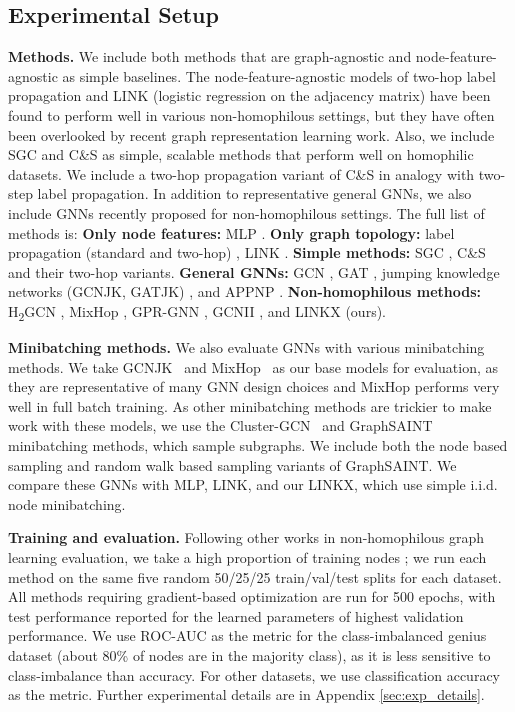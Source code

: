 \documentclass{article}
\newcommand{\myparagraph}[1]{\noindent \textbf{#1}}
\begin{document}
\subsection{Experimental Setup}\label{sec:experimental_setup}

\myparagraph{Methods.} We include both methods that are graph-agnostic and node-feature-agnostic as simple baselines. The node-feature-agnostic models of two-hop label propagation \cite{peel2017graph} and LINK (logistic regression on the adjacency matrix) \cite{zheleva2009to} have been found to perform well in various non-homophilous settings, but they have often been overlooked by recent graph representation learning work. Also, we include SGC \cite{wu2019simplifying} and C\&S \cite{huang2021combining} as simple, scalable methods that perform well on homophilic datasets. We include a two-hop propagation variant of C\&S in analogy with two-step label propagation. In addition to representative general GNNs, we also include GNNs recently proposed for non-homophilous settings. The full list of methods is: \textbf{Only node features:} MLP \cite{goodfellow2016deep}.
\textbf{Only graph topology:} label propagation (standard and two-hop) \cite{zhou2004learning, peel2017graph}, LINK \cite{zheleva2009to}.
\textbf{Simple methods:} SGC \cite{wu2019simplifying}, C\&S \cite{huang2021combining} and their two-hop variants.
\textbf{General GNNs:} GCN \cite{kipf2017semi}, GAT \cite{velivckovic2018graph}, jumping knowledge networks (GCNJK, GATJK) \cite{xu2018representation}, and APPNP \cite{klicpera2019predict}.
\textbf{Non-homophilous methods:} H\textsubscript{2}GCN \cite{zhu2020beyond}, MixHop \cite{abu2019mixhop}, GPR-GNN \cite{chien2021adaptive}, GCNII \cite{chen2020simple}, and LINKX (ours).

\myparagraph{Minibatching methods.} We also evaluate GNNs with various minibatching methods. We take GCNJK~\cite{xu2018representation} and MixHop~\cite{abu2019mixhop} as our base models for evaluation, as they are representative of many GNN design choices and MixHop performs very well in full batch training. As other minibatching methods are trickier to make work with these models, we use the Cluster-GCN~\cite{chiang2019cluster} and GraphSAINT~\cite{zeng2019graphsaint} minibatching methods, which sample subgraphs. We include both the node based sampling and random walk based sampling variants of GraphSAINT. We compare these GNNs with MLP, LINK, and our LINKX, which use simple i.i.d. node minibatching.

\myparagraph{Training and evaluation.} Following other works in non-homophilous graph learning evaluation, we take a high proportion of training nodes \cite{zhu2020beyond, pei2019geom, yan2021two}; we run each method on the same five random 50/25/25 train/val/test splits for each dataset. All methods requiring gradient-based optimization are run for 500 epochs, with test performance reported for the learned parameters of highest validation performance. We use ROC-AUC as the metric for the class-imbalanced genius dataset (about 80\% of nodes are in the majority class), as it is less sensitive to class-imbalance than accuracy.  For other datasets, we use classification accuracy as the metric. Further experimental details are in Appendix \ref{sec:exp_details}.
\end{document}
